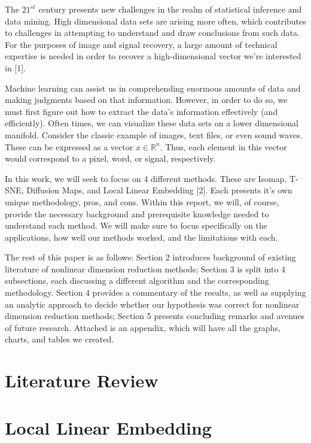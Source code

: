 \documentclass[12pt]{article}
\begin{document}
\hspace{5mm}The $21^{st}$ century presents new challenges in the realm of statistical inference and data mining. High dimensional data sets are arising more often, which contributes to challenges in attempting to understand and draw conclusions from such data. For the purposes of image and signal recovery, a large amount of technical expertise is needed in order to recover a high-dimensional vector we're interested in [1].

Machine learning can assist us in comprehending enormous amounts of data and making judgments based on that information. However, in order to do so, we must first figure out how to extract the data's information effectively (and efficiently). Often times, we can visualize these data sets on a lower dimensional manifold. Consider the classic example of images, text files, or even sound waves. These can be expressed as a vector $x\in\mathbb{R}^n$. Thus, each element in this vector would correspond to a pixel, word, or signal, respectively.

In this work, we will seek to focus on 4 different methods. These are Isomap, T-SNE, Diffusion Maps, and Local Linear Embedding [2]. Each presents it's own unique methodology, pros, and cons. Within this report, we will, of course, provide the necessary background and prerequisite knowledge needed to understand each method. We will make sure to focus specifically on the applications, how well our methods worked, and the limitations with each. 

The rest of this paper is as follows: Section 2 introduces background of existing literature of nonlinear dimension reduction methods; Section 3 is split into 4 subsections, each discussing a different algorithm and the corresponding methodology. Section 4 provides a commentary of the results, as well as supplying an analytic approach to decide whether our hypothesis was correct for nonlinear dimension reduction methods; Section 5 presents concluding remarks and avenues of future research. Attached is an appendix, which will have all the graphs, charts, and tables we created.


\section{Literature Review}




\section{Local Linear Embedding} \label{sec:Local Linear Embedding}
\end{document}
